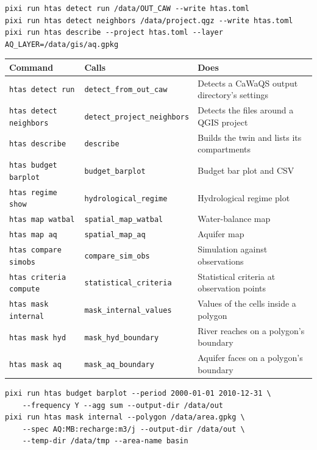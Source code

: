 \documentclass[11pt]{article}
\begin{document}
\begin{verbatim}
pixi run htas detect run /data/OUT_CAW --write htas.toml
pixi run htas detect neighbors /data/project.qgz --write htas.toml
pixi run htas describe --project htas.toml --layer AQ_LAYER=/data/gis/aq.gpkg
\end{verbatim}

\begin{center}
\begin{tabularx}{\textwidth}{l l X}
\toprule
\textbf{Command} & \textbf{Calls} & \textbf{Does} \\
\midrule
\texttt{htas detect run} & \texttt{detect\_from\_out\_caw} & Detects a CaWaQS output directory's settings \\
\texttt{htas detect neighbors} & \texttt{detect\_project\_neighbors} & Detects the files around a QGIS project \\
\texttt{htas describe} & \texttt{describe} & Builds the twin and lists its compartments \\
\texttt{htas budget barplot} & \texttt{budget\_barplot} & Budget bar plot and CSV \\
\texttt{htas regime show} & \texttt{hydrological\_regime} & Hydrological regime plot \\
\texttt{htas map watbal} & \texttt{spatial\_map\_watbal} & Water-balance map \\
\texttt{htas map aq} & \texttt{spatial\_map\_aq} & Aquifer map \\
\texttt{htas compare simobs} & \texttt{compare\_sim\_obs} & Simulation against observations \\
\texttt{htas criteria compute} & \texttt{statistical\_criteria} & Statistical criteria at observation points \\
\texttt{htas mask internal} & \texttt{mask\_internal\_values} & Values of the cells inside a polygon \\
\texttt{htas mask hyd} & \texttt{mask\_hyd\_boundary} & River reaches on a polygon's boundary \\
\texttt{htas mask aq} & \texttt{mask\_aq\_boundary} & Aquifer faces on a polygon's boundary \\
\bottomrule
\end{tabularx}
\end{center}

\begin{verbatim}
pixi run htas budget barplot --period 2000-01-01 2010-12-31 \
    --frequency Y --agg sum --output-dir /data/out
pixi run htas mask internal --polygon /data/area.gpkg \
    --spec AQ:MB:recharge:m3/j --output-dir /data/out \
    --temp-dir /data/tmp --area-name basin
\end{verbatim}
\end{document}
